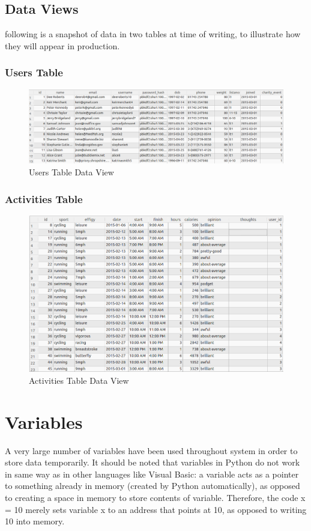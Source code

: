 \documentclass{article}[12pt,a4paper]
\begin{document}
\clearpage

\subsection{Data Views}
following is a snapshot of data in two tables at time of writing, to illustrate how they will appear in production.

\subsubsection{Users Table}
\begin{figure}[h!]
  \includegraphics[scale=0.37]{images/database/users_visual}
  \caption{Users Table Data View}
\end{figure}

\subsubsection{Activities Table}
\begin{figure}[h!]
  \includegraphics[scale=0.37]{images/database/activities_visual}
  \caption{Activities Table Data View}
\end{figure}

\section{Variables}
A very large number of variables have been used throughout system in order to store data temporarily. It should be noted that variables in Python do not work in same way as in other languages like Visual Basic: a variable acts as a pointer to something already in memory (created by Python automatically), as opposed to creating a space in memory to store contents of variable. Therefore, the code x = 10 merely sets variable x to an address that points at 10, as opposed to writing 10 into memory.
\end{document}
